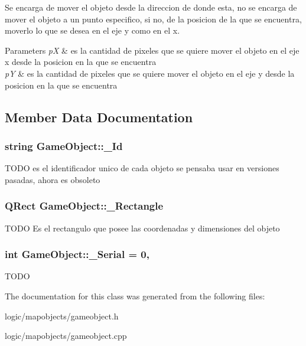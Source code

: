 Se encarga de mover el objeto desde la direccion de donde esta, no se encarga de mover el objeto a un punto especifico, si no, de la posicion de la que se encuentra, moverlo lo que se desea en el eje y como en el x. 


\begin{DoxyParams}{Parameters}
{\em p\-X} & es la cantidad de pixeles que se quiere mover el objeto en el eje x desde la posicion en la que se encuentra \\
\hline
{\em p\-Y} & es la cantidad de pixeles que se quiere mover el objeto en el eje y desde la posicion en la que se encuentra \\
\hline
\end{DoxyParams}


\subsection{Member Data Documentation}
\hypertarget{class_game_object_a74075bae5de6b22a17098e60964e676b}{
\subsubsection[{\-\_\-\-Id}]{\setlength{\rightskip}{0pt plus 5cm}string Game\-Object\-::\-\_\-\-Id\hspace{0.3cm}{\ttfamily [protected]}}}\label{class_game_object_a74075bae5de6b22a17098e60964e676b}
T\-O\-D\-O es el identificador unico de cada objeto se pensaba usar en versiones pasadas, ahora es obsoleto \hypertarget{class_game_object_a38a2dff83aae28ebffee5c4b833626a2}{
\subsubsection[{\-\_\-\-Rectangle}]{\setlength{\rightskip}{0pt plus 5cm}Q\-Rect Game\-Object\-::\-\_\-\-Rectangle\hspace{0.3cm}{\ttfamily [protected]}}}\label{class_game_object_a38a2dff83aae28ebffee5c4b833626a2}
T\-O\-D\-O Es el rectangulo que posee las coordenadas y dimensiones del objeto \hypertarget{class_game_object_aeeec17db7fc77fe70148a9d6edd99ea4}{
\subsubsection[{\-\_\-\-Serial}]{\setlength{\rightskip}{0pt plus 5cm}int Game\-Object\-::\-\_\-\-Serial = 0\hspace{0.3cm}{\ttfamily [static]}, {\ttfamily [protected]}}}\label{class_game_object_aeeec17db7fc77fe70148a9d6edd99ea4}
T\-O\-D\-O 

The documentation for this class was generated from the following files\-:\begin{DoxyCompactItemize}
\item 
logic/mapobjects/gameobject.\-h\item 
logic/mapobjects/gameobject.\-cpp\end{DoxyCompactItemize}
